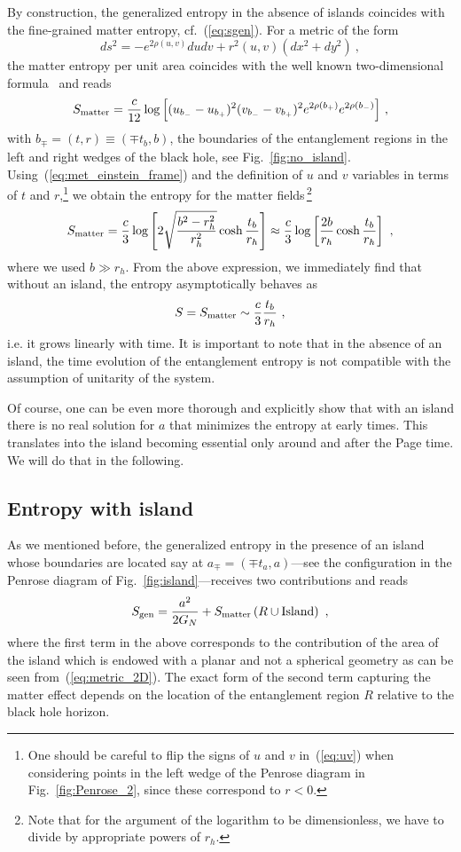 \documentclass[a4paper, 12pt]{article}
\def\be{\begin{equation}}
\def\ee{\end{equation}}
\begin{document}
By construction, the generalized entropy in the absence of islands coincides with the fine-grained matter entropy, cf.~(\ref{eq:sgen}). For a metric of the form
\be
\label{eq:metric_2D}
ds^2 = - e^{2\rho(u,v)} du dv +r^2(u,v)(dx^2+dy^2) \ ,
\ee
the matter entropy per unit area coincides with the well known two-dimensional formula~\cite{Fiola:1994ir} and reads
\be
\label{eq:entr_formula_noisl}
S_{\rm matter} = \frac{c}{12} \log \Big[ (u_{b_-}-u_{b_+})^2(v_{b_-}-v_{b_+})^2 e^{2\rho(b_+)} e^{2\rho(b_-)}\Big] \ ,
\ee
with $b_{\mp}=(t,r)\equiv(\mp t_b,b)$, the boundaries of the entanglement regions in the left and right wedges of the black hole, see Fig.~\ref{fig:no_island}. Using~(\ref{eq:met_einstein_frame}) and the definition of $u$ and $v$ variables in terms of $t$ and $r$,\footnote{One should be careful to flip the signs of $u$ and $v$ in~(\ref{eq:uv}) when considering points in the left wedge of the Penrose diagram in Fig.~\ref{fig:Penrose_2}, since these correspond to $r<0$.}  we obtain the entropy for the matter fields\,\footnote{Note that for the argument of the logarithm to be dimensionless, we have to divide by appropriate powers of $r_h$.}
\be
\label{eq:smatter_ein}
S_{\rm matter} = \frac {c} {3} \log \left[2 \sqrt{\frac{b^2-r_h^2}{r_h^2}}\cosh \frac{t_b}{r_h}\right]\approx \frac {c} {3} \log \left[\frac{2b}{r_h}\cosh \frac{t_b}{r_h}\right] \ ,
\ee
where we used $b\gg r_h$. From the above expression, we immediately find that without an island, the entropy asymptotically behaves as 
\be
\label{eq:entr_no_island}
S=S_{\rm matter} \sim \frac{c}{3} \frac{t_b}{r_h}  \ ,
\ee
i.e. it grows linearly with time.  It is important to note that in the absence of an island, the time evolution of the entanglement entropy is not compatible with the assumption of unitarity of the system. 

Of course, one can be even more thorough and explicitly show that with an island there is no real solution for $a$ that minimizes the entropy at early times. This translates into the island becoming essential only around and after the Page time. We will do that in the following.

\subsection{Entropy with island}

As we mentioned before, the generalized entropy in the presence of an island whose boundaries are located say at $a_\mp=(\mp t_a,a)$---see the configuration in the Penrose diagram of Fig.~\ref{fig:island}---receives two contributions and reads
\be
\label{eq:entrop_island_a}
S_{\rm gen} = \frac{ a^2 }{2G_N} + S_{\rm matter}\left(R\cup\text{Island}\right) \ ,
\ee
where the first term in the above corresponds to the contribution of the area of the island which is endowed with a planar and not a spherical geometry as can be seen from~(\ref{eq:metric_2D}). The exact form of the second term capturing the matter effect depends on the location of the entanglement region $R$ relative to the black hole horizon. 
\end{document}
